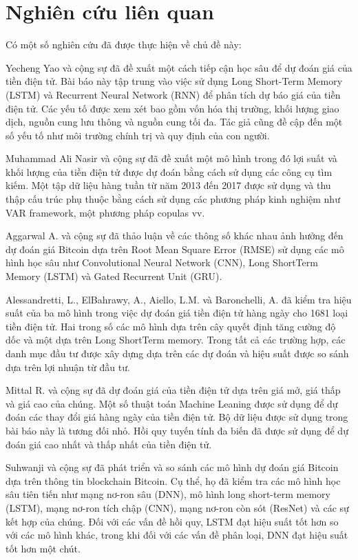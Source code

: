 \documentclass[conference]{IEEEtran}
\begin{document}
	\section{Nghiên cứu liên quan}
	
	Có một số nghiên cứu đã được thực hiện về chủ đề này:\par
	Yecheng Yao và cộng sự \cite{b1} đã đề xuất một cách tiếp cận học sâu để dự đoán giá của tiền điện tử. Bài báo này tập trung vào việc sử dụng Long Short-Term Memory (LSTM) và Recurrent Neural Network (RNN) để phân tích dự báo giá của tiền điện tử. Các yếu tố được xem xét bao gồm vốn hóa thị trường, khối lượng giao dịch, nguồn cung lưu thông và nguồn cung tối đa. Tác giả cũng đề cập đến một số yếu tố như môi trường chính trị và quy định của con người.\par
	Muhammad Ali Nasir và cộng sự \cite{b2} đã đề xuất một mô hình trong đó lợi suất và khối lượng của tiền điện tử được dự đoán bằng cách sử dụng các công cụ tìm kiếm. Một tập dữ liệu hàng tuần từ năm 2013 đến 2017 được sử dụng và thu thập cấu trúc phụ thuộc bằng cách sử dụng các phương pháp kinh nghiệm như VAR framework, một phương pháp copulas vv.\par
	Aggarwal A. và cộng sự \cite{b3} đã thảo luận về các thông số khác nhau ảnh hưởng đến dự đoán giá Bitcoin dựa trên Root Mean Square Error (RMSE) sử dụng các mô hình học sâu như Convolutional Neural Network (CNN), Long ShortTerm Memory (LSTM) và Gated Recurrent Unit (GRU).\par
	Alessandretti, L., ElBahrawy, A., Aiello, L.M. và Baronchelli, A. \cite{b4} đã kiểm tra hiệu suất của ba mô hình trong việc dự đoán giá tiền điện tử hàng ngày cho 1681 loại tiền điện tử. Hai trong số các mô hình dựa trên cây quyết định tăng cường độ dốc và một dựa trên Long ShortTerm memory. Trong tất cả các trường hợp, các danh mục đầu tư được xây dựng dựa trên các dự đoán và hiệu suất được so sánh dựa trên lợi nhuận từ đầu tư.\par
	Mittal R. và cộng sự \cite{b5} đã dự đoán giá của tiền điện tử dựa trên giá mở, giá thấp và giá cao của chúng. Một số thuật toán Machine Leaning được sử dụng để dự đoán các thay đổi giá hàng ngày của tiền điện tử. Bộ dữ liệu được sử dụng trong bài báo này là tương đối nhỏ. Hồi quy tuyến tính đa biến đã được sử dụng để dự đoán giá cao nhất và thấp nhất của tiền điện tử.\par
	Suhwanji và cộng sự \cite{b6} đã phát triển và so sánh các mô hình dự đoán giá Bitcoin dựa trên thông tin blockchain Bitcoin. Cụ thể, họ đã kiểm tra các mô hình học sâu tiên tiến như mạng nơ-ron sâu (DNN), mô hình long short-term memory (LSTM), mạng nơ-ron tích chập (CNN), mạng nơ-ron còn sót (ResNet) và các sự kết hợp của chúng. Đối với các vấn đề hồi quy, LSTM đạt hiệu suất tốt hơn so với các mô hình khác, trong khi đối với các vấn đề phân loại, DNN đạt hiệu suất tốt hơn một chút.\par
\end{document}
